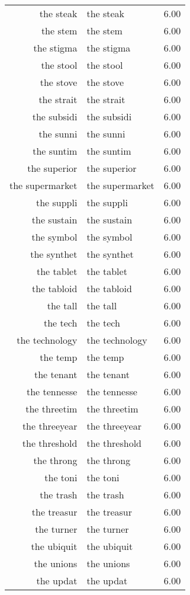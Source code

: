 \begin{table}[ht]
\begin{tabular}{rlr}
  the steak & the steak & 6.00 \\ 
  the stem & the stem & 6.00 \\ 
  the stigma & the stigma & 6.00 \\ 
  the stool & the stool & 6.00 \\ 
  the stove & the stove & 6.00 \\ 
  the strait & the strait & 6.00 \\ 
  the subsidi & the subsidi & 6.00 \\ 
  the sunni & the sunni & 6.00 \\ 
  the suntim & the suntim & 6.00 \\ 
  the superior & the superior & 6.00 \\ 
  the supermarket & the supermarket & 6.00 \\ 
  the suppli & the suppli & 6.00 \\ 
  the sustain & the sustain & 6.00 \\ 
  the symbol & the symbol & 6.00 \\ 
  the synthet & the synthet & 6.00 \\ 
  the tablet & the tablet & 6.00 \\ 
  the tabloid & the tabloid & 6.00 \\ 
  the tall & the tall & 6.00 \\ 
  the tech & the tech & 6.00 \\ 
  the technology & the technology & 6.00 \\ 
  the temp & the temp & 6.00 \\ 
  the tenant & the tenant & 6.00 \\ 
  the tennesse & the tennesse & 6.00 \\ 
  the threetim & the threetim & 6.00 \\ 
  the threeyear & the threeyear & 6.00 \\ 
  the threshold & the threshold & 6.00 \\ 
  the throng & the throng & 6.00 \\ 
  the toni & the toni & 6.00 \\ 
  the trash & the trash & 6.00 \\ 
  the treasur & the treasur & 6.00 \\ 
  the turner & the turner & 6.00 \\ 
  the ubiquit & the ubiquit & 6.00 \\ 
  the unions & the unions & 6.00 \\ 
  the updat & the updat & 6.00 \\ 

\end{tabular}
\end{table}
